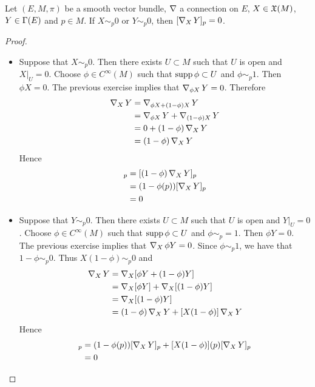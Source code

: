 \documentclass{book}
\begin{document}
	\begin{ex}
		Let $(E, M, \pi)$ be a smooth vector bundle, $\operatorname{\nabla}$ a connection on $E$, $X \in \mathfrak{X}(M)$, $Y \in \Gamma(E)$ and $p \in M$. If $X \sim_p 0$ or $Y \sim_p 0$, then $[\operatorname{\nabla}_{X}Y]_p = 0$.
	\end{ex}

	\begin{proof}\
		\begin{itemize}
			\item Suppose that $X \sim_p 0$. Then there exists $U \subset M$ such that $U$ is open and $X|_U = 0$. Choose $\phi  \in C^{\infty}(M)$ such that $\operatorname{supp} \phi  \subset U$ and $\phi \sim_p 1$. Then $\phi  X = 0$. The previous exercise implies that $\operatorname{\nabla}_{\phi  X} Y = 0$. Therefore
			\begin{align*}
				\operatorname{\nabla}_X Y
				& = \operatorname{\nabla}_{\phi  X + (1- \phi )X}Y \\
				& = \operatorname{\nabla}_{\phi  X}Y + \operatorname{\nabla}_{(1 - \phi ) X}Y \\
				& = 0 + (1 - \phi )\operatorname{\nabla}_X Y \\
				& = (1 - \phi )\operatorname{\nabla}_X Y \\
			\end{align*}
			Hence 
			\begin{align*}
				[\nab_X Y]_p
				& =[(1 - \phi )\nab_X Y]_p \\
				& = (1 - \phi (p))[\nab_X Y]_p \\
				& = 0 
			\end{align*} 
			\item Suppose that $Y \sim_p 0$. Then there exists $U \subset M$ such that $U$ is open and $Y|_U = 0$. Choose $\phi \in C^{\infty}(M)$ such that $\operatorname{supp} \phi  \subset U$ and $\phi \sim_p = 1$. Then $\phi  Y = 0$. The previous exercise implies that $\operatorname{\nabla}_X \phi Y = 0$. Since $\phi \sim_p 1$, we have that $1 - \phi \sim_p 0$. Thus $X (1 - \phi) \sim_p 0$ and 
			\begin{align*}
				\operatorname{\nabla}_X Y
				& = \operatorname{\nabla}_X [\phi Y + (1- \phi)Y] \\
				& = \operatorname{\nabla}_X [\phi Y] + \operatorname{\nabla}_X[(1 - \phi) Y] \\
				& = \operatorname{\nabla}_X[(1 - \phi) Y] \\
				& = (1- \phi) \operatorname{\nabla}_X Y + [X(1 - \phi)] \operatorname{\nabla}_X Y \\
			\end{align*}
			Hence
			\begin{align*}
				[\nab_X Y]_p
				& = (1- \phi(p)) [\nab_X Y]_p + [X(1 - \phi)](p) [\nab_X Y]_p \\ 
				& = 0
			\end{align*} 
		\end{itemize}
	\end{proof}
\end{document}
